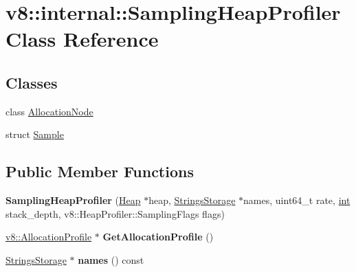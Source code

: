 \hypertarget{classv8_1_1internal_1_1SamplingHeapProfiler}{}\section{v8\+:\+:internal\+:\+:Sampling\+Heap\+Profiler Class Reference}
\label{classv8_1_1internal_1_1SamplingHeapProfiler}
\subsection*{Classes}
\begin{DoxyCompactItemize}
\item 
class \mbox{\hyperlink{classv8_1_1internal_1_1SamplingHeapProfiler_1_1AllocationNode}{Allocation\+Node}}
\item 
struct \mbox{\hyperlink{structv8_1_1internal_1_1SamplingHeapProfiler_1_1Sample}{Sample}}
\end{DoxyCompactItemize}
\subsection*{Public Member Functions}
\begin{DoxyCompactItemize}
\item 
\mbox{\label{classv8_1_1internal_1_1SamplingHeapProfiler_a9e2ced230d5ba8793f768022acda90d9}} 
{\bfseries Sampling\+Heap\+Profiler} (\mbox{\hyperlink{classv8_1_1internal_1_1Heap}{Heap}} $\ast$heap, \mbox{\hyperlink{classv8_1_1internal_1_1StringsStorage}{Strings\+Storage}} $\ast$names, uint64\+\_\+t rate, \mbox{\hyperlink{classint}{int}} stack\+\_\+depth, v8\+::\+Heap\+Profiler\+::\+Sampling\+Flags flags)
\item 
\mbox{\label{classv8_1_1internal_1_1SamplingHeapProfiler_a6eb106cbd50f0f07fed2ca0e35692cd8}} 
\mbox{\hyperlink{classv8_1_1AllocationProfile}{v8\+::\+Allocation\+Profile}} $\ast$ {\bfseries Get\+Allocation\+Profile} ()
\item 
\mbox{\label{classv8_1_1internal_1_1SamplingHeapProfiler_a4c22ff5760e85f2903286ac4ddffef99}} 
\mbox{\hyperlink{classv8_1_1internal_1_1StringsStorage}{Strings\+Storage}} $\ast$ {\bfseries names} () const
\end{DoxyCompactItemize}
